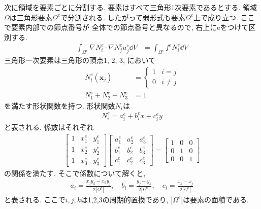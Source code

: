 \documentclass[paper=a4]{jlreq}
\begin{document}
次に領域を要素ごとに分割する. 要素はすべて三角形1次要素であるとする.
領域$\Omega$は三角形要素$\Omega^e$で分割される.
したがって弱形式も要素$\Omega^e$上で成り立つ. ここで要素内部での節点番号が
全体での節点番号と異なるので, 右上にeをつけて区別する.
\begin{align}
    \int_{\Omega^e} \nabla N^e_i \cdot \nabla N^e_j u^e_j \dd{V}
    &= \int_{\Omega^e} f^eN_i^e\dd{V} \label{eq:weak_form_elemtnt}
\end{align}
三角形一次要素は三角形の頂点1, 2, 3, において
\begin{align}
    N^e_i(\bm{x}_j) &= 
    \begin{cases}
        1 & i = j \\
        0 & i \neq j 
    \end{cases}\\
    N^e_1 + N^e_2 + N^e_3 &= 1
\end{align}
を満たす形状関数を持つ.
形状関数$N_i$は
\begin{align}
    N^e_i = a^e_i +b^e_i x +c^e_i y \label{eq:shape_function}
\end{align}
と表される.
係数はそれぞれ
\begin{align}
    \begin{bmatrix}
        1 & x^e_1 & y^e_1 \\
        1 & x^e_2 & y^e_2 \\
        1 & x^e_3 & y^e_3
    \end{bmatrix}
    \begin{bmatrix}
        a^e_1 & a^e_2 & a^e_3 \\
        b^e_1 & b^e_2 & b^e_3 \\
        c^e_1 & c^e_2 & c^e_3
    \end{bmatrix}
    =
    \begin{bmatrix}
        1 & 0 & 0 \\
        0 & 1 & 0 \\
        0 & 0 & 1
    \end{bmatrix}
\end{align}
の関係を満たす. そこで係数について解くと, 
\begin{align}
    a_i = \frac{x_jy_k - x_ky_j}{2|\Omega^e|},\quad
    b_i = \frac{y_j- y_k}{2|\Omega^e|},\quad
    c_i = \frac{x_k - x_j}{2|\Omega^e|} 
\end{align}
と表される. ここで$i,j,k$は1,2,3の周期的置換であり, $|\Omega^e|$は要素の面積である.
\end{document}

